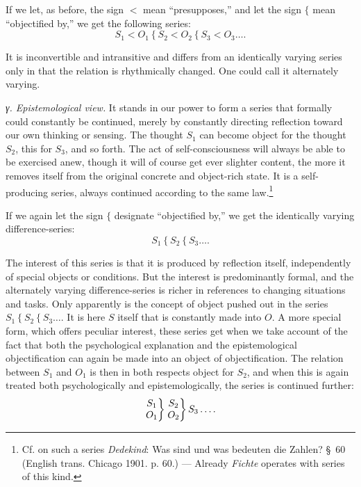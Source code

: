 \documentclass[12pt,a4paper]{book}
\newcommand{\opage}[1]{\marginnote{\footnotesize\textit{[#1]}}}
\begin{document}
If we let, as before, the sign $<$ mean ``presupposes,'' and let the sign $\{$ mean
``objectified by,'' we get the following series:
\[ S_1 < O_1 \mathrel{\{} S_2 < O_2 \mathrel{\{} S_3 < O_3 \ldots. \]

It is inconvertible and intransitive and differs from an identically varying series only
in that the relation is rhythmically changed. One could call it alternately varying.

\emph{γ. Epistemological view.} It stands in our power to form a series that formally
could constantly be continued, merely by constantly directing reflection toward our own
thinking or sensing. The thought $S_1$ can become object for the thought $S_2$, this for
$S_3$, and so forth. The act of self-consciousness will always be able to be exercised
anew, though it will of course get ever slighter content, the more it removes itself from
the \opage{300}original concrete and object-rich state. It is a self-producing series, always
continued according to the same law.\footnote{Cf. on such a series \emph{Dedekind}: Was
sind und was bedeuten die Zahlen? \S\ 60 (English trans. Chicago 1901. p. 60.) ---
Already \emph{Fichte} operates with series of this kind.}

If we again let the sign $\{$ designate ``objectified by,'' we get the identically
varying difference-series:
\[ S_1 \mathrel{\{} S_2 \mathrel{\{} S_3 \ldots. \]

The interest of this series is that it is produced by reflection itself, independently of
special objects or conditions. But the interest is predominantly formal, and the
alternately varying difference-series is richer in references to changing situations and
tasks. Only apparently is the concept of object pushed out in the series $S_1 \mathrel{\{}
S_2 \mathrel{\{} S_3 \ldots$. It is here $S$ itself that is constantly made into $O$. A more
special form, which offers peculiar interest, these series get when we take account of the
fact that both the psychological explanation and the epistemological objectification can
again be made into an object of objectification. The relation between $S_1$ and $O_1$ is
then in both respects object for $S_2$, and when this is again treated both
psychologically and epistemologically, the series is continued further:
\[ \left.\begin{array}{@{}c@{}} S_1 \\ O_1 \end{array}\right\}
   \left.\begin{array}{@{}c@{}} S_2 \\ O_2 \end{array}\right\}
   S_3 \ldots. \]
\end{document}
